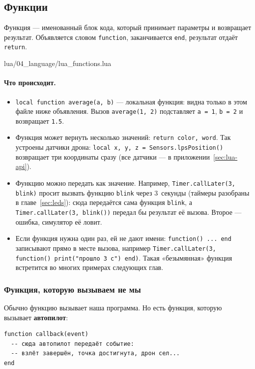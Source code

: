 \subsection{Функции}

Функция --- именованный блок кода, который принимает параметры и возвращает результат. Объявляется словом \verb|function|, заканчивается \verb|end|, результат отдаёт \verb|return|.

\begin{codefile}{lua/04_language/lua_functions.lua}
\end{codefile}

\paragraph{Что происходит.}
\begin{itemize}
    \item \verb|local function average(a, b)| --- локальная функция: видна только в этом файле ниже объявления. Вызов \verb|average(1, 2)| подставляет \verb|a = 1|, \verb|b = 2| и возвращает \verb|1.5|.
    \item Функция может вернуть несколько значений: \verb|return color, word|. Так устроены датчики дрона: \verb|local x, y, z = Sensors.lpsPosition()| возвращает три координаты сразу (все датчики --- в приложении~\ref{sec:lua-api}).
    \item Функцию можно передать как значение. Например, \verb|Timer.callLater(3, blink)| просит вызвать функцию \verb|blink| через 3~секунды (таймеры разобраны в главе~\ref{sec:leds}): сюда передаётся сама функция \verb|blink|, а \verb|Timer.callLater(3, blink())| передал бы результат её вызова. Второе --- ошибка, симулятор её ловит.
    \item Если функция нужна один раз, ей не дают имени: \verb|function() ... end| записывают прямо в месте вызова, например \verb|Timer.callLater(3, function() print("прошло 3 с") end)|. Такая «безымянная» функция встретится во многих примерах следующих глав.
\end{itemize}

\subsubsection*{Функция, которую вызываем не мы}

Обычно функцию вызывает наша программа. Но есть функция, которую вызывает \textbf{автопилот}:

\begin{codebox}
\begin{verbatim}
function callback(event)
  -- сюда автопилот передаёт событие:
  -- взлёт завершён, точка достигнута, дрон сел...
end
\end{verbatim}
\end{codebox}


